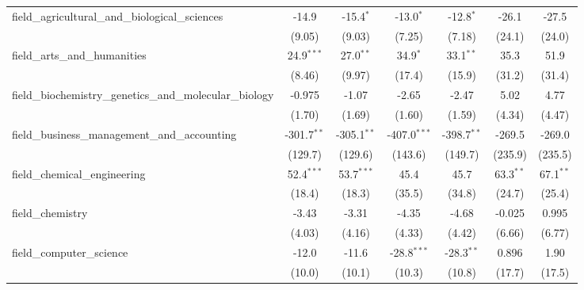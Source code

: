 \begin{tabular}{lcccccc}
   field\_agricultural\_and\_biological\_sciences              & -14.9         & -15.4$^{*}$   & -13.0$^{*}$    & -12.8$^{*}$    & -26.1       & -27.5\\   
                                                               & (9.05)        & (9.03)        & (7.25)         & (7.18)         & (24.1)      & (24.0)\\   
   field\_arts\_and\_humanities                                & 24.9$^{***}$  & 27.0$^{**}$   & 34.9$^{*}$     & 33.1$^{**}$    & 35.3        & 51.9\\   
                                                               & (8.46)        & (9.97)        & (17.4)         & (15.9)         & (31.2)      & (31.4)\\   
   field\_biochemistry\_genetics\_and\_molecular\_biology      & -0.975        & -1.07         & -2.65          & -2.47          & 5.02        & 4.77\\   
                                                               & (1.70)        & (1.69)        & (1.60)         & (1.59)         & (4.34)      & (4.47)\\   
   field\_business\_management\_and\_accounting                & -301.7$^{**}$ & -305.1$^{**}$ & -407.0$^{***}$ & -398.7$^{**}$  & -269.5      & -269.0\\   
                                                               & (129.7)       & (129.6)       & (143.6)        & (149.7)        & (235.9)     & (235.5)\\   
   field\_chemical\_engineering                                & 52.4$^{***}$  & 53.7$^{***}$  & 45.4           & 45.7           & 63.3$^{**}$ & 67.1$^{**}$\\   
                                                               & (18.4)        & (18.3)        & (35.5)         & (34.8)         & (24.7)      & (25.4)\\   
   field\_chemistry                                            & -3.43         & -3.31         & -4.35          & -4.68          & -0.025      & 0.995\\   
                                                               & (4.03)        & (4.16)        & (4.33)         & (4.42)         & (6.66)      & (6.77)\\   
   field\_computer\_science                                    & -12.0         & -11.6         & -28.8$^{***}$  & -28.3$^{**}$   & 0.896       & 1.90\\   
                                                               & (10.0)        & (10.1)        & (10.3)         & (10.8)         & (17.7)      & (17.5)\\   

\end{tabular}
